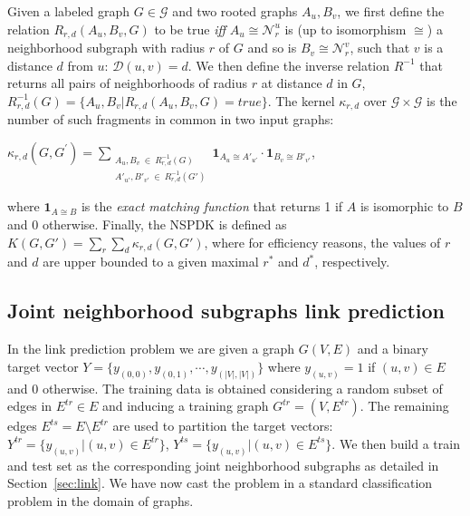 \documentclass[runningheads,a4paper]{llncs}
\begin{document}
Given a labeled graph $G \in \mathcal{G}$ and two rooted graphs $A_u, B_v$, we first define the relation $R_{r,d}(A_u, B_v, G)$ to be true {\em iff} $A_u \cong \mathcal{N}_r^u$ is (up to isomorphism $\cong$) a neighborhood subgraph with radius $r$ of $G$ and so is $B_v \cong  \mathcal{N}_r^v$, such that $v$ is a distance $d$ from $u$: $\mathcal{D}(u,v)= d$. We then define the inverse relation $R^{-1}$ that returns all pairs of neighborhoods of radius $r$ at distance $d$ in $G$, $R^{-1}_{r,d}(G) = \lbrace A_u, B_v | R_{r,d}(A_u,B_v,G)=true\rbrace$. The kernel $\kappa_{r,d}$ over $\mathcal{G} \times \mathcal{G}$ is the number of such fragments in common in two input graphs:
\begin{center}
$\kappa_{r,d}(G,G^{'}) = 
\!\!\!\!\!\!\!\!\!\!\!\! 
\sum\limits_{\substack{A_u, B_v \ \in \ R_{r,d}^{-1}(G) \\ 
{A'}_{u'}, {B'}_{v'} \ \in \ R_{r,d}^{-1}(G')
}} \!\!\!\!\!\!\!\!\!\!\!\!  { { \textbf{1}_{A_{u} \cong A'_{u'}}} \cdot {
\textbf{1}_{B_{v} \cong B'_{v'}}} }$, 
\end{center}
\noindent where $\textbf{1}_{A \cong B}$ is the \textit{exact matching function} that returns 1 if $A$ is isomorphic to $B$ and 0 otherwise. Finally, the NSPDK is defined as $K(G,G') = \sum\limits_{r}{\sum\limits_{d}{\kappa_{r,d}(G,G')}}$, where for efficiency reasons, the values of $r$ and $d$ are upper bounded to a given maximal $r^*$ and $d^*$, respectively.


\subsection{Joint neighborhood subgraphs link prediction}

In the link prediction problem we are given a graph $G(V,E)$ and a binary target vector $Y=\{y_{(0,0)},y_{(0,1)}, \cdots, y_{(|V|,|V|)}\}$ where $y_{(u,v)}=1$ if $(u,v) \in E$ and 0 otherwise. The training data is obtained considering a random subset of edges in $E^{tr} \in E$ and inducing a training graph $G^{tr}=(V,E^{tr})$. The remaining edges $E^{ts} = E \setminus E^{tr}$ are used to partition the target vectors: $Y^{tr} = \{y_{(u,v)} | (u,v) \in E^{tr}\}$, $Y^{ts} = \{y_{(u,v)} | (u,v) \in E^{ts}\}$.
We then build a train and test set as the corresponding joint neighborhood subgraphs as detailed in Section~\ref{sec:link}. We have now cast the problem in a standard classification problem in the domain of graphs. 
\end{document}
